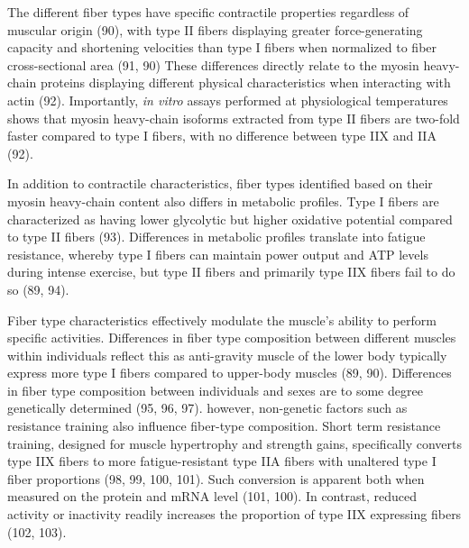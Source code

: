 \documentclass[twoside,10pt]{gihclass} %
\begin{document}
The different fiber types have specific contractile properties regardless of muscular origin
(90),
with type II fibers displaying greater force-generating capacity and shortening velocities than type I fibers when normalized to fiber cross-sectional area
(91, 90)
These differences directly relate to the myosin heavy-chain proteins displaying different physical characteristics when interacting with actin
(92).
Importantly, \emph{in vitro} assays performed at physiological temperatures shows that myosin heavy-chain isoforms extracted from type II fibers are two-fold faster compared to type I fibers, with no difference between type IIX and IIA
(92).

In addition to contractile characteristics, fiber types identified based on their myosin heavy-chain content also differs in metabolic profiles.
Type I fibers are characterized as having lower glycolytic but higher oxidative potential compared to type II fibers
(93).
Differences in metabolic profiles translate into fatigue resistance, whereby type I fibers can maintain power output and ATP levels during intense exercise, but type II fibers and primarily type IIX fibers fail to do so
(89, 94).

Fiber type characteristics effectively modulate the muscle's ability to perform specific activities. Differences in fiber type composition between different muscles within individuals reflect this as anti-gravity muscle of the lower body typically express more type I fibers compared to upper-body muscles
(89, 90).
Differences in fiber type composition between individuals and sexes are to some degree genetically determined
(95, 96, 97).
however, non-genetic factors such as resistance training also influence fiber-type composition. Short term resistance training, designed for muscle hypertrophy and strength gains, specifically converts type IIX fibers to more fatigue-resistant type IIA fibers with unaltered type I fiber proportions
(98, 99, 100, 101).
Such conversion is apparent both when measured on the protein and mRNA level
(101, 100).
In contrast, reduced activity or inactivity readily increases the proportion of type IIX expressing fibers
(102, 103).
\end{document}
